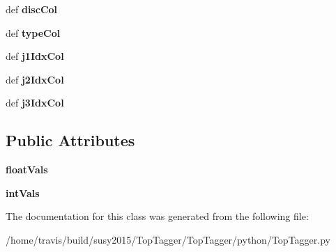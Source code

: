 \begin{DoxyCompactItemize}
\item 
\hypertarget{classTopTagger_1_1TopTaggerResult_a32f5571bb549f945142321c052a48b0e}{def {\bfseries disc\-Col}}\label{classTopTagger_1_1TopTaggerResult_a32f5571bb549f945142321c052a48b0e}

\item 
\hypertarget{classTopTagger_1_1TopTaggerResult_ad5f834f8c5f222968cf097c90ae40727}{def {\bfseries type\-Col}}\label{classTopTagger_1_1TopTaggerResult_ad5f834f8c5f222968cf097c90ae40727}

\item 
\hypertarget{classTopTagger_1_1TopTaggerResult_aeaa1583eba0cdac2500c2c037ad35cbf}{def {\bfseries j1\-Idx\-Col}}\label{classTopTagger_1_1TopTaggerResult_aeaa1583eba0cdac2500c2c037ad35cbf}

\item 
\hypertarget{classTopTagger_1_1TopTaggerResult_a948e97b94fabcae7d74bf8d10e98e3ac}{def {\bfseries j2\-Idx\-Col}}\label{classTopTagger_1_1TopTaggerResult_a948e97b94fabcae7d74bf8d10e98e3ac}

\item 
\hypertarget{classTopTagger_1_1TopTaggerResult_ab0b36426494d556c53cbfccd64b29bb0}{def {\bfseries j3\-Idx\-Col}}\label{classTopTagger_1_1TopTaggerResult_ab0b36426494d556c53cbfccd64b29bb0}

\end{DoxyCompactItemize}
\subsection*{Public Attributes}
\begin{DoxyCompactItemize}
\item 
\hypertarget{classTopTagger_1_1TopTaggerResult_a3e180987b6abcfe7cc7c40b199f0c386}{{\bfseries float\-Vals}}\label{classTopTagger_1_1TopTaggerResult_a3e180987b6abcfe7cc7c40b199f0c386}

\item 
\hypertarget{classTopTagger_1_1TopTaggerResult_a6cf9e0d32998c8ac16efaaa4ae32c2ad}{{\bfseries int\-Vals}}\label{classTopTagger_1_1TopTaggerResult_a6cf9e0d32998c8ac16efaaa4ae32c2ad}

\end{DoxyCompactItemize}


The documentation for this class was generated from the following file\-:\begin{DoxyCompactItemize}
\item 
/home/travis/build/susy2015/\-Top\-Tagger/\-Top\-Tagger/python/Top\-Tagger.\-py\end{DoxyCompactItemize}
